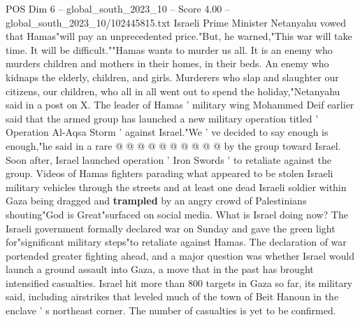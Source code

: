 \begin{textsample}{POS Dim 6 – global\_south\_2023\_10 – Score 4.00 – global\_south\_2023\_10/102445815.txt}
Israeli Prime Minister Netanyahu vowed that Hamas"will pay an unprecedented price."But, he warned,"This war will take time.
It will be difficult.""Hamas wants to murder us all.
It is an enemy who murders children and mothers in their homes, in their beds.
An enemy who kidnaps the elderly, children, and girls.
Murderers who slap and slaughter our citizens, our children, who all in all went out to spend the holiday,"Netanyahu said in a post on X.
The leader of Hamas ' military wing Mohammed Deif earlier said that the armed group has launched a new military operation titled ' Operation Al-Aqsa Storm ' against Israel."We ' ve decided to say enough is enough,"he said in a rare @ @ @ @ @ @ @ @ @ @ by the group toward Israel.
Soon after, Israel launched operation ' Iron Swords ' to retaliate against the group.
Videos of Hamas fighters parading what appeared to be stolen Israeli military vehicles through the streets and at least one dead Israeli soldier within Gaza being dragged and \textbf{trampled} by an angry crowd of Palestinians shouting"God is Great"surfaced on social media.
What is Israel doing now?
The Israeli government formally declared war on Sunday and gave the green light for"significant military steps"to retaliate against Hamas.
The declaration of war portended greater fighting ahead, and a major question was whether Israel would launch a ground assault into Gaza, a move that in the past has brought intensified casualties.
Israel hit more than 800 targets in Gaza so far, its military said, including airstrikes that leveled much of the town of Beit Hanoun in the enclave ' s northeast corner.
The number of casualties is yet to be confirmed.

\end{textsample}

